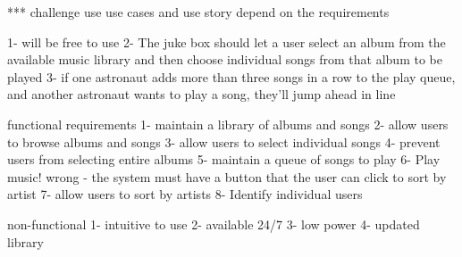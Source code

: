 *** challenge   
use   use cases and  use story depend on the requirements 

1- will be free to use 
2- The juke box should let a user select an album from the available music library
and then choose individual songs from that album to be played
3- if one astronaut adds more than three songs in a row to the play queue, and another astronaut wants to play a song, they'll jump ahead in line

functional requirements 
1- maintain a library of albums and songs 
2- allow users to browse albums and songs 
3- allow users to select individual songs 
4- prevent users from selecting entire albums
5- maintain a queue of songs to play 
6- Play music! 
wrong - the system must have a button that the user can click to sort by artist
7- allow users to sort by artists 
8- Identify individual users 

non-functional
1- intuitive to use
2- available 24/7 
3- low power 
4- updated library 
